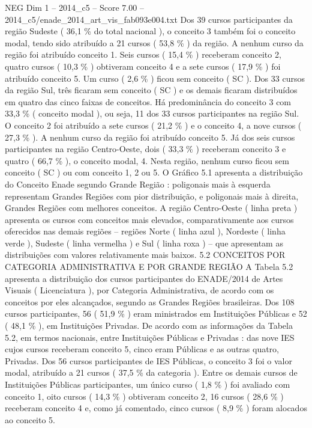 \begin{textsample}{NEG Dim 1 – 2014\_c5 – Score 7.00 – 2014\_c5/enade\_2014\_art\_vis\_fab093e004.txt}
Dos 39 cursos participantes da região Sudeste ( 36,1 \% do total nacional ), o conceito 3 também foi o conceito modal, tendo sido atribuído a 21 cursos ( 53,8 \% ) da região.
A nenhum curso da região foi atribuído conceito 1.
Seis cursos ( 15,4 \% ) receberam conceito 2, quatro cursos ( 10,3 \% ) obtiveram conceito 4 e a sete cursos ( 17,9 \% ) foi atribuído conceito 5.
Um curso ( 2,6 \% ) ficou sem conceito ( SC ).
Dos 33 cursos da região Sul, três ficaram sem conceito ( SC ) e os demais ficaram distribuídos em quatro das cinco faixas de conceitos.
Há predominância do conceito 3 com 33,3 \% ( conceito modal ), ou seja, 11 dos 33 cursos participantes na região Sul.
O conceito 2 foi atribuído a sete cursos ( 21,2 \% ) e o conceito 4, a nove cursos ( 27,3 \% ).
A nenhum curso da região foi atribuído conceito 5.
Já dos seis cursos participantes na região Centro-Oeste, dois ( 33,3 \% ) receberam conceito 3 e quatro ( 66,7 \% ), o conceito modal, 4.
Nesta região, nenhum curso ficou sem conceito ( SC ) ou com conceito 1, 2 ou 5.
O Gráfico 5.1 apresenta a distribuição do Conceito Enade segundo Grande Região : poligonais mais à esquerda representam Grandes Regiões com pior distribuição, e poligonais mais à direita, Grandes Regiões com melhores conceitos.
A região Centro-Oeste ( linha preta ) apresenta os cursos com conceitos mais elevados, comparativamente aos cursos oferecidos nas demais regiões – regiões Norte ( linha azul ), Nordeste ( linha verde ), Sudeste ( linha vermelha ) e Sul ( linha roxa ) – que apresentam as distribuições com valores relativamente mais baixos. 5.2 CONCEITOS POR CATEGORIA ADMINISTRATIVA E POR GRANDE REGIÃO A Tabela 5.2 apresenta a distribuição dos cursos participantes do ENADE/2014 de Artes Visuais ( Licenciatura ), por Categoria Administrativa, de acordo com os conceitos por eles alcançados, segundo as Grandes Regiões brasileiras.
Dos 108 cursos participantes, 56 ( 51,9 \% ) eram ministrados em Instituições Públicas e 52 ( 48,1 \% ), em Instituições Privadas.
De acordo com as informações da Tabela 5.2, em termos nacionais, entre Instituições Públicas e Privadas : das nove IES cujos cursos receberam conceito 5, cinco eram Públicas e as outras quatro, Privadas.
Dos 56 cursos participantes de IES Públicas, o conceito 3 foi o valor modal, atribuído a 21 cursos ( 37,5 \% da categoria ).
Entre os demais cursos de Instituições Públicas participantes, um único curso ( 1,8 \% ) foi avaliado com conceito 1, oito cursos ( 14,3 \% ) obtiveram conceito 2, 16 cursos ( 28,6 \% ) receberam conceito 4 e, como já comentado, cinco cursos ( 8,9 \% ) foram alocados ao conceito 5.

\end{textsample}
